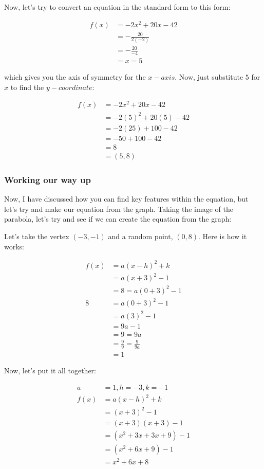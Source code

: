 Now, let's try to convert an equation in the standard form to this form:

\begin{align}
    f(x) &= -2x^2 + 20x - 42 \\
         &= -\frac{20}{2(-2)} \\
         &= -\frac{20}{-4} \\
         &= x = 5
\end{align}

which gives you the axis of symmetry for the $x-axis$. Now, just substitute $5$ for $x$ to find the $y-coordinate$:

\begin{align}
    f(x) &= -2x^2 + 20x - 42 \\
         &= -2(5)^2 + 20(5) - 42 \\
         &= -2(25) + 100 - 42 \\
         &= -50 + 100 - 42 \\
         &= 8 \\
         &= (5, 8)
\end{align}

\subsubsection*{Working our way up}

\begin{marginfigure}
    \centering
    \label{fig:parabola}
\end{marginfigure}

Now, I have discussed how you can find key features within the equation, but let's try and make our equation from the graph.
Taking the image of the parabola, let's try and see if we can create the equation from the graph:

Let's take the vertex $(-3, -1)$ and a random point, $(0, 8)$. Here is how it works:

\begin{align}
    f(x) &= a(x - h)^2 + k \\
         &= a(x + 3)^2 - 1 \\
         &= 8 = a(0 + 3)^2 - 1 \\
    8 &= a(0 + 3)^2 - 1 \\
       &= a(3)^2 - 1 \\
       &= 9a - 1 \\
       &= 9 = 9a \\
       &= \frac{9}{9} = \frac{9}{9a} \\
       &= 1
\end{align}

Now, let's put it all together:

\begin{align}
    a &= 1, h = -3, k = -1 \\
    f(x) &= a(x - h)^2 + k \\
         &= (x + 3)^2 - 1 \\
         &= (x + 3)(x + 3) - 1 \\
         &= (x^2 + 3x + 3x + 9) - 1 \\
         &= (x^2 + 6x + 9) - 1 \\
         &= x^2 + 6x + 8 \\
\end{align}

\newpage
